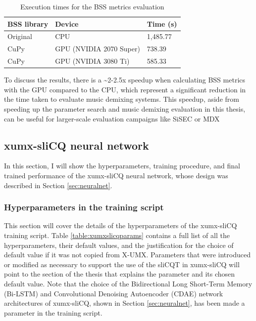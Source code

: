 \documentclass[report.tex]{subfiles}
\begin{document}
\begin{table}[ht]
	\centering
	\caption{Execution times for the BSS metrics evaluation}
	\label{table:cupybssresults}
	\begin{tabular}{ |l|l|l| }
	 \hline
		BSS library & Device & Time (s) \\
	 \hline
	 \hline
		Original & CPU & 1,485.77 \\
	 \hline
		CuPy & GPU (NVIDIA 2070 Super) & 738.39 \\
	 \hline
		CuPy & GPU (NVIDIA 3080 Ti) & 585.33 \\
	 \hline
\end{tabular}
\end{table}

To discuss the results, there is a \textasciitilde2-2.5x speedup when calculating BSS metrics with the GPU compared to the CPU, which represent a significant reduction in the time taken to evaluate music demixing systems. This speedup, aside from speeding up the parameter search and music demixing evaluation in this thesis, can be useful for larger-scale evaluation campaigns like SiSEC \parencite{sisec2018} or MDX \parencite{mdx21}

\newpagefill

\subsection{xumx-sliCQ neural network}
\label{sec:nnresults}

In this section, I will show the hyperparameters, training procedure, and final trained performance of the xumx-sliCQ neural network, whose design was described in Section \ref{sec:neuralnet}.

\subsubsection{Hyperparameters in the training script}
\label{sec:hyperparams}

This section will cover the details of the hyperparameters of the xumx-sliCQ training script. Table \ref{table:xumxslicqparams} contains a full list of all the hyperparameters, their default values, and the justification for the choice of default value if it was not copied from X-UMX. Parameters that were introduced or modified as necessary to support the use of the sliCQT in xumx-sliCQ will point to the section of the thesis that explains the parameter and its chosen default value. Note that the choice of the Bidirectional Long Short-Term Memory (Bi-LSTM) and Convolutional Denoising Autoencoder (CDAE) network architectures of xumx-sliCQ, shown in Section \ref{sec:neuralnet}, has been made a parameter in the training script.
\end{document}
